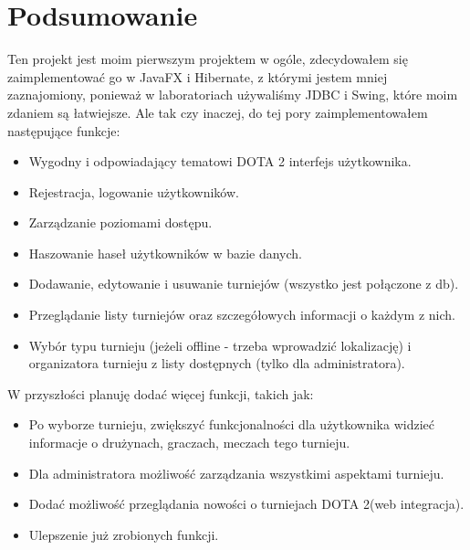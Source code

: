 \chapter{Podsumowanie}
\label{cha:podsumowanie}

Ten projekt jest moim pierwszym projektem w ogóle, zdecydowałem się zaimplementować go w JavaFX i Hibernate, z którymi jestem mniej zaznajomiony, ponieważ w laboratoriach używaliśmy JDBC i Swing, które moim zdaniem są łatwiejsze. Ale tak czy inaczej, do tej pory zaimplementowałem następujące funkcje:
\begin{itemize}
    \item Wygodny i odpowiadający tematowi DOTA 2 interfejs użytkownika.
    \item Rejestracja, logowanie użytkowników.
    \item Zarządzanie poziomami dostępu.
    \item Haszowanie haseł użytkowników w bazie danych.
    \item Dodawanie, edytowanie i usuwanie turniejów (wszystko jest połączone z db).
    \item Przeglądanie listy turniejów oraz szczegółowych informacji o każdym z nich.
    \item Wybór typu turnieju (jeżeli offline - trzeba wprowadzić lokalizację) i organizatora turnieju z listy dostępnych (tylko dla administratora).
\end{itemize}

W przyszłości planuję dodać więcej funkcji, takich jak:
\begin{itemize}
    \item Po wyborze turnieju, zwiększyć funkcjonalności dla użytkownika widzieć informacje o drużynach, graczach, meczach tego turnieju.
    \item Dla administratora możliwość zarządzania wszystkimi aspektami turnieju.
    \item Dodać możliwość przeglądania nowości o turniejach DOTA 2(web integracja).
    \item Ulepszenie już zrobionych funkcji.
\end{itemize}